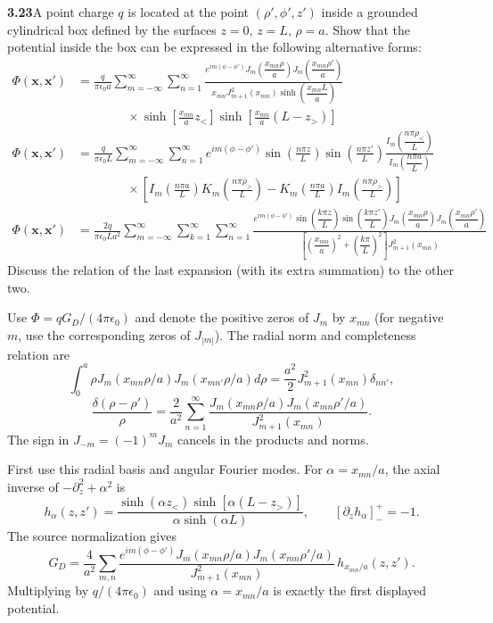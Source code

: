 \par\bigskip
\noindent\textbf{3.23}\quad A point charge $q$ is located at the point $(\rho',\phi',z')$ inside a grounded cylindrical box defined by the surfaces $z=0$, $z=L$, $\rho=a$. Show that the potential inside the box can be expressed in the following alternative forms:
\begin{align*}
\Phi(\mathbf{x},\mathbf{x}')&=\frac{q}{\pi\epsilon_{0}a}\sum_{m=-\infty}^{\infty}\sum_{n=1}^{\infty}\frac{e^{im(\phi-\phi')}J_{m}\!\left(\dfrac{x_{mn}\rho}{a}\right)\!J_{m}\!\left(\dfrac{x_{mn}\rho'}{a}\right)}{x_{mn}J_{m+1}^{2}(x_{mn})\sinh\!\left(\dfrac{x_{mn}L}{a}\right)}\\
&\qquad\qquad\times\sinh\!\left[\frac{x_{mn}}{a}z_{<}\right]\sinh\!\left[\frac{x_{mn}}{a}(L-z_{>})\right]\\[6pt]
\Phi(\mathbf{x},\mathbf{x}')&=\frac{q}{\pi\epsilon_{0}L}\sum_{m=-\infty}^{\infty}\sum_{n=1}^{\infty}e^{im(\phi-\phi')}\sin\!\left(\frac{n\pi z}{L}\right)\sin\!\left(\frac{n\pi z'}{L}\right)\frac{I_{m}\!\left(\dfrac{n\pi\rho_{<}}{L}\right)}{I_{m}\!\left(\dfrac{n\pi a}{L}\right)}\\
&\qquad\qquad\times\left[I_{m}\!\left(\frac{n\pi a}{L}\right)\!K_{m}\!\left(\frac{n\pi\rho_{>}}{L}\right)-K_{m}\!\left(\frac{n\pi a}{L}\right)\!I_{m}\!\left(\frac{n\pi\rho_{>}}{L}\right)\right]\\[6pt]
\Phi(\mathbf{x},\mathbf{x}')&=\frac{2q}{\pi\epsilon_{0}La^{2}}\sum_{m=-\infty}^{\infty}\sum_{k=1}^{\infty}\sum_{n=1}^{\infty}\frac{e^{im(\phi-\phi')}\sin\!\left(\dfrac{k\pi z}{L}\right)\sin\!\left(\dfrac{k\pi z'}{L}\right)\!J_{m}\!\left(\dfrac{x_{mn}\rho}{a}\right)\!J_{m}\!\left(\dfrac{x_{mn}\rho'}{a}\right)}{\left[\left(\dfrac{x_{mn}}{a}\right)^{2}+\left(\dfrac{k\pi}{L}\right)^{2}\right]\!J_{m+1}^{2}(x_{mn})}
\end{align*}
Discuss the relation of the last expansion (with its extra summation) to the other two.
\solution

Use $\Phi=qG_D/(4\pi\epsilon_0)$ and denote the positive zeros
of $J_m$ by $x_{mn}$ (for negative $m$, use the corresponding zeros
of $J_{|m|}$).  The radial norm and completeness relation are
\[
\int_0^a\rho J_m(x_{mn}\rho/a)J_m(x_{mn'}\rho/a)d\rho
=\frac{a^2}2J_{m+1}^2(x_{mn})\delta_{nn'},
\]
\[
\frac{\delta(\rho-\rho')}{\rho}
=\frac2{a^2}\sum_{n=1}^\infty
\frac{J_m(x_{mn}\rho/a)J_m(x_{mn}\rho'/a)}{J_{m+1}^2(x_{mn})}.
\]
The sign in $J_{-m}=(-1)^mJ_m$ cancels in the products and norms.

First use this radial basis and angular Fourier modes.  For
$\alpha=x_{mn}/a$, the axial inverse of $-\partial_z^2+\alpha^2$
is
\[
h_\alpha(z,z')=
\frac{\sinh(\alpha z_<)\sinh[\alpha(L-z_>)]}{\alpha\sinh(\alpha L)},
\qquad [\partial_zh_\alpha]_-^+=-1.
\]
The source normalization gives
\[
G_D=\frac4{a^2}\sum_{m,n}
\frac{e^{im(\phi-\phi')}J_m(x_{mn}\rho/a)J_m(x_{mn}\rho'/a)}
{J_{m+1}^2(x_{mn})}\,h_{x_{mn}/a}(z,z').
\]
Multiplying by $q/(4\pi\epsilon_0)$ and using $\alpha=x_{mn}/a$
is exactly the first displayed potential.

